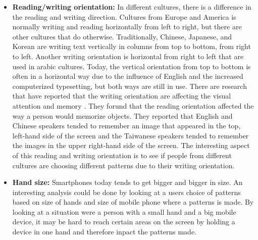\begin{itemize}
    \item {\bf Reading/writing orientation:} In different cultures, there is a difference in the reading and writing direction. Cultures from Europe and America is normally writing and reading horizontally from left to right, but there are other cultures that do otherwise. Traditionally, Chinese, Japanese, and Korean are writing text vertically in columns from top to bottom, from right to left. Another writing orientation is horizontal from right to left that are used in arabic cultures. Today, the vertical orientation from top to bottom is often in a horizontal way due to the influence of English and the increased computerized typesetting, but both ways are still in use. There are research that have reported that the writing orientation are affecting the visual attention and memory \cite{Chan}. They forund that the reading orientation affected the way a person would memorize objects. They reported that English and Chinese speakers tended to remember an image that appeared in the top, left-hand side of the screen and the Taiwanese speakers tended to remember the images in the upper right-hand side of the screen. The interesting aspect of this reading and writing orientation is to see if people from different cultures are choosing different patterns due to their writing orientation.
    \item {\bf Hand size:} Smartphones today tends to get bigger and bigger in size. An interesting analysis could be done by looking at a users choice of patterns based on size of hands and size of mobile phone where a patterns is made. By looking at a situation were a person with a small hand and a big mobile device, it may be hard to reach certain areas on the screen by holding a device in one hand and therefore inpact the patterns made. 
  \end{itemize}

